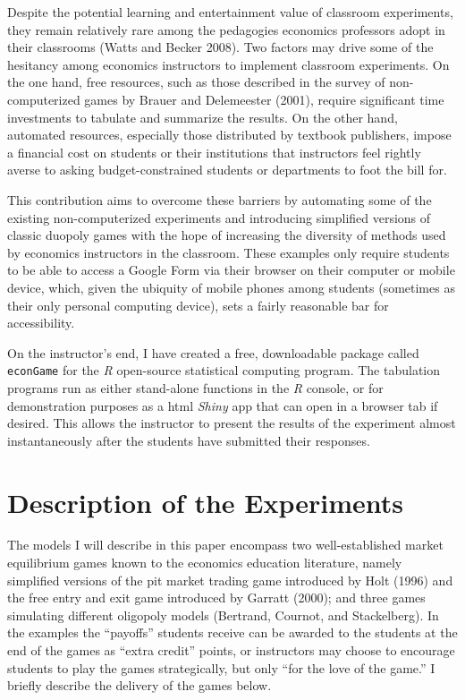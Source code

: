 \documentclass[
]{article}
\begin{document}
Despite the potential learning and entertainment value of classroom
experiments, they remain relatively rare among the pedagogies economics
professors adopt in their classrooms (Watts and Becker 2008). Two
factors may drive some of the hesitancy among economics instructors to
implement classroom experiments. On the one hand, free resources, such
as those described in the survey of non-computerized games by Brauer and
Delemeester (2001), require significant time investments to tabulate and
summarize the results. On the other hand, automated resources,
especially those distributed by textbook publishers, impose a financial
cost on students or their institutions that instructors feel rightly
averse to asking budget-constrained students or departments to foot the
bill for.

This contribution aims to overcome these barriers by automating some of
the existing non-computerized experiments and introducing simplified
versions of classic duopoly games with the hope of increasing the
diversity of methods used by economics instructors in the classroom.
These examples only require students to be able to access a Google Form
via their browser on their computer or mobile device, which, given the
ubiquity of mobile phones among students (sometimes as their only
personal computing device), sets a fairly reasonable bar for
accessibility.

On the instructor's end, I have created a free, downloadable package
called \texttt{econGame} for the \emph{R} open-source statistical
computing program. The tabulation programs run as either stand-alone
functions in the \emph{R} console, or for demonstration purposes as a
html \emph{Shiny} app that can open in a browser tab if desired. This
allows the instructor to present the results of the experiment almost
instantaneously after the students have submitted their responses.

\hypertarget{description-of-the-experiments}{%
\section{Description of the
Experiments}\label{description-of-the-experiments}}

The models I will describe in this paper encompass two well-established
market equilibrium games known to the economics education literature,
namely simplified versions of the pit market trading game introduced by
Holt (1996) and the free entry and exit game introduced by Garratt
(2000); and three games simulating different oligopoly models (Bertrand,
Cournot, and Stackelberg). In the examples the ``payoffs'' students
receive can be awarded to the students at the end of the games as
``extra credit'' points, or instructors may choose to encourage students
to play the games strategically, but only ``for the love of the game.''
I briefly describe the delivery of the games below.
\end{document}
